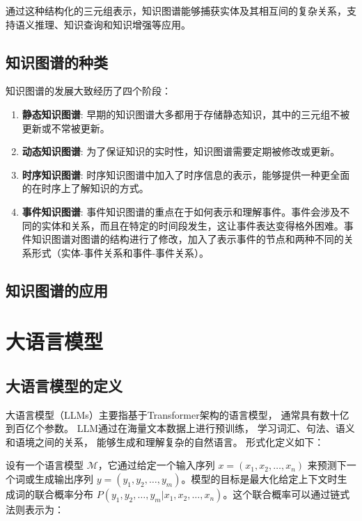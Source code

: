 通过这种结构化的三元组表示，知识图谱能够捕获实体及其相互间的复杂关系，支持语义推理、知识查询和知识增强等应用。

\subsection{知识图谱的种类}
知识图谱的发展大致经历了四个阶段\cite{Jiang2023}：

\begin{enumerate}
  \item \textbf{静态知识图谱}: 早期的知识图谱大多都用于存储静态知识，其中的三元组不被更新或不常被更新。
  \item \textbf{动态知识图谱}: 为了保证知识的实时性，知识图谱需要定期被修改或更新。
  \item \textbf{时序知识图谱}: 时序知识图谱中加入了时序信息的表示，能够提供一种更全面的在时序上了解知识的方式。
  \item \textbf{事件知识图谱}: 事件知识图谱的重点在于如何表示和理解事件。事件会涉及不同的实体和关系，而且在特定的时间段发生，这让事件表达变得格外困难。事件知识图谱对图谱的结构进行了修改，加入了表示事件的节点和两种不同的关系形式（实体-事件关系和事件-事件关系）。
\end{enumerate}

\subsection{知识图谱的应用}



\section{大语言模型}

\subsection{大语言模型的定义}

大语言模型（LLMs）主要指基于Transformer架构的语言模型，
通常具有数十亿到百亿个参数。
LLM通过在海量文本数据上进行预训练，
学习词汇、句法、语义和语境之间的关系，
能够生成和理解复杂的自然语言。
形式化定义如下：

设有一个语言模型 \( \mathcal{M} \)，它通过给定一个输入序列 \( x = (x_1, x_2, \dots, x_n) \) 来预测下一个词或生成输出序列 \( y = (y_1, y_2, \dots, y_m) \)。模型的目标是最大化给定上下文时生成词的联合概率分布 \( P(y_1, y_2, \dots, y_m | x_1, x_2, \dots, x_n) \)。这个联合概率可以通过链式法则表示为：

